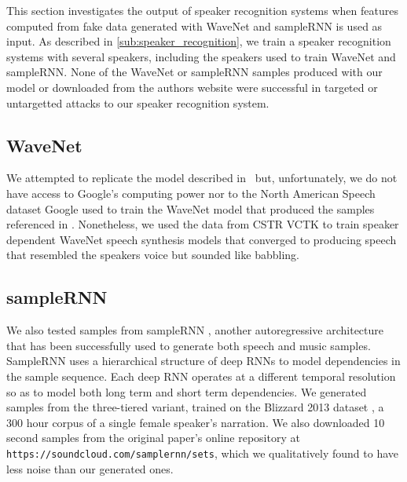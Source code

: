 This section investigates the output of speaker recognition systems when
features computed from fake data generated with WaveNet and sampleRNN is used as
input. As described in \ref{sub:speaker_recognition}, we train a speaker
recognition systems with several speakers, including the speakers used to train
WaveNet and sampleRNN. None of the WaveNet or sampleRNN samples produced with
our model or downloaded from the authors website were successful in targeted or 
untargetted attacks to our speaker recognition system.

\subsection{WaveNet} %
\label{sub:res-WaveNet}
We attempted to replicate the model described in~\cite{van2016wavenet} but,
unfortunately, we do not have access to Google's computing power nor to the
North American Speech dataset Google used to train the WaveNet model that
produced the samples referenced in \cite{van2016wavenet}. Nonetheless, we used
the data from CSTR VCTK to train speaker dependent WaveNet speech synthesis
models that converged to producing speech that resembled the speakers voice but
sounded like babbling. 
\subsection{sampleRNN} %
\label{sub:samplernn}
We also tested samples from sampleRNN \cite{mehri2016samplernn}, another
autoregressive architecture that has been successfully used to generate both
speech and music samples. SampleRNN uses a hierarchical structure of deep RNNs
to model dependencies in the sample sequence. Each deep RNN operates at a
different temporal resolution so as to model both long term and short term
dependencies. We generated samples from the three-tiered variant, trained on the
Blizzard 2013 dataset \cite{prahallad2013blizzard}, a 300 hour corpus of a
single female speaker's narration. We also downloaded 10 second samples from the
original paper's online repository at
\texttt{https://soundcloud.com/samplernn/sets}, which we qualitatively found to
have less noise than our generated ones. 

